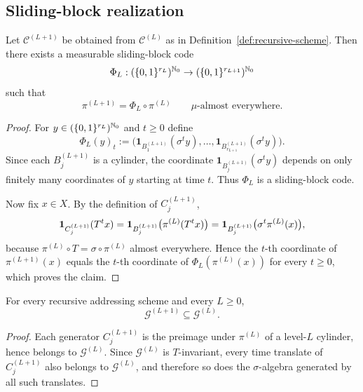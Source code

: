 \subsection{Sliding-block realization}

\begin{proposition}
\label{prop:sliding-block-factor}
Let \(\mathcal{C}^{(L+1)}\) be obtained from \(\mathcal{C}^{(L)}\) as in
Definition~\ref{def:recursive-scheme}.  Then there exists a measurable
sliding-block code
\[
  \Phi_L:(\{0,1\}^{r_L})^{\mathbb{N}_0}
  \to (\{0,1\}^{r_{L+1}})^{\mathbb{N}_0}
\]
such that
\[
  \pi^{(L+1)} = \Phi_L\circ \pi^{(L)}
  \qquad \mu\text{-almost everywhere}.
\]
\end{proposition}

\begin{proof}
For \(y\in (\{0,1\}^{r_L})^{\mathbb{N}_0}\) and \(t\geq 0\) define
\[
  \Phi_L(y)_t
  := \bigl(
      \mathbf{1}_{B^{(L+1)}_1}(\sigma^t y),\ldots,
      \mathbf{1}_{B^{(L+1)}_{r_{L+1}}}(\sigma^t y)
     \bigr).
\]
Since each \(B^{(L+1)}_j\) is a cylinder, the coordinate
\(\mathbf{1}_{B^{(L+1)}_j}(\sigma^t y)\) depends on only finitely many
coordinates of \(y\) starting at time \(t\).  Thus \(\Phi_L\) is a
sliding-block code.

Now fix \(x\in X\).  By the definition of \(C^{(L+1)}_j\),
\[
  \mathbf{1}_{C^{(L+1)}_j}(T^t x)
  = \mathbf{1}_{B^{(L+1)}_j}\bigl(\pi^{(L)}(T^t x)\bigr)
  = \mathbf{1}_{B^{(L+1)}_j}\bigl(\sigma^t \pi^{(L)}(x)\bigr),
\]
because \(\pi^{(L)}\circ T=\sigma\circ \pi^{(L)}\) almost everywhere.
Hence the \(t\)-th coordinate of \(\pi^{(L+1)}(x)\) equals the \(t\)-th
coordinate of \(\Phi_L(\pi^{(L)}(x))\) for every \(t\geq 0\), which
proves the claim.
\end{proof}

\begin{corollary}
\label{cor:sigma-nonexpansion}
For every recursive addressing scheme and every \(L\geq 0\),
\[
  \mathcal{G}^{(L+1)} \subseteq \mathcal{G}^{(L)}.
\]
\end{corollary}

\begin{proof}
Each generator \(C^{(L+1)}_j\) is the preimage under \(\pi^{(L)}\) of a
level-\(L\) cylinder, hence belongs to \(\mathcal{G}^{(L)}\).  Since
\(\mathcal{G}^{(L)}\) is \(T\)-invariant, every time translate of
\(C^{(L+1)}_j\) also belongs to \(\mathcal{G}^{(L)}\), and therefore so
does the \(\sigma\)-algebra generated by all such translates.
\end{proof}

